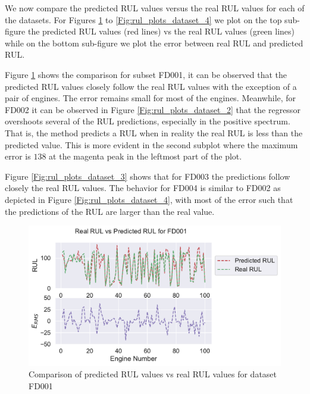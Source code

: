 \documentclass[preprint,12pt]{elsarticle}%
\begin{document}
We now compare the predicted RUL values versus the real RUL values for each of the datasets. For Figures \ref{Fig:rul_plots_dataset_1} to \ref{Fig:rul_plots_dataset_4} we plot on the top sub-figure the predicted RUL values (red lines) vs the real RUL values (green lines) while on the bottom sub-figure we plot the error between real RUL and predicted RUL.

Figure \ref{Fig:rul_plots_dataset_1} shows the comparison for subset FD001, it can be observed that the predicted RUL values closely follow the real RUL values with the exception of a pair of engines. The error remains small for most of the engines. Meanwhile, for FD002 it can be observed in Figure \ref{Fig:rul_plots_dataset_2} that the regressor overshoots several of the RUL predictions, especially in the positive spectrum. That is, the method predicts a RUL when in reality the real RUL is less than the predicted value. This is more evident in the second subplot where the maximum error is $138$ at the magenta peak in the leftmost part of the plot.

Figure \ref{Fig:rul_plots_dataset_3} shows that for FD003 the predictions follow closely the real RUL values. The behavior for FD004 is similar to FD002 as depicted in Figure \ref{Fig:rul_plots_dataset_4}, with most of the error such that the predictions of the RUL are larger than the real value.

\pagebreak

\begin{figure}[H]
\begin{center}
\includegraphics[scale=0.7]{Figures/rul_plots_dataset_1.pdf}
\caption{Comparison of predicted RUL values vs real RUL values for dataset FD001}
\label{Fig:rul_plots_dataset_1}
\end{center}
\end{figure}
\end{document}
